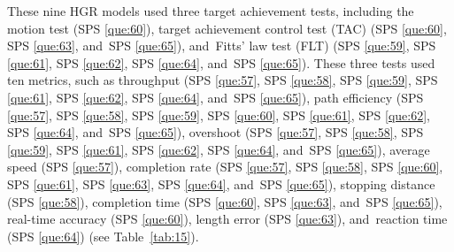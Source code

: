 \documentclass[sensors,review,accept,moreauthors,pdftex]{Definitions/mdpi}
\begin{document}
These nine HGR models used three target achievement tests, including the motion test (SPS \ref{que:60}), target achievement control test (TAC) (SPS \ref{que:60}, SPS \ref{que:63}, and~SPS \ref{que:65}), and~Fitts’ law test (FLT) (SPS \ref{que:59}, SPS \ref{que:61}, SPS \ref{que:62}, SPS \ref{que:64}, and~SPS \ref{que:65}). These three tests used ten metrics, such as throughput (SPS \ref{que:57}, SPS \ref{que:58}, SPS \ref{que:59}, SPS \ref{que:61}, SPS \ref{que:62}, SPS \ref{que:64}, and~SPS \ref{que:65}), path efficiency (SPS \ref{que:57}, SPS \ref{que:58}, SPS \ref{que:59}, SPS \ref{que:60}, SPS \ref{que:61}, SPS \ref{que:62}, SPS \ref{que:64}, and~SPS \ref{que:65}), overshoot (SPS \ref{que:57}, SPS \ref{que:58}, SPS \ref{que:59}, SPS \ref{que:61}, SPS \ref{que:62}, SPS \ref{que:64}, and~SPS \ref{que:65}), average speed (SPS \ref{que:57}), completion rate (SPS \ref{que:57}, SPS \ref{que:58}, SPS \ref{que:60}, SPS \ref{que:61}, SPS \ref{que:63}, SPS \ref{que:64}, and~SPS \ref{que:65}), stopping distance (SPS \ref{que:58}), completion time (SPS \ref{que:60}, SPS \ref{que:63}, and~SPS \ref{que:65}), real-time accuracy (SPS \ref{que:60}), length error (SPS \ref{que:63}), and~reaction time (SPS \ref{que:64}) (see Table~\ref{tab:15}).
\end{document}
